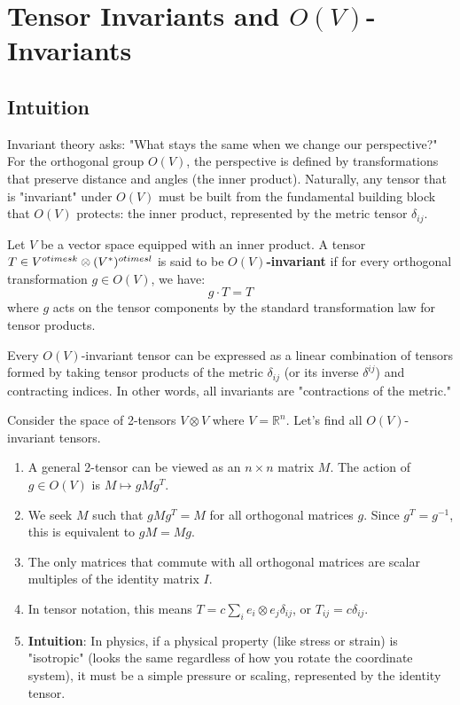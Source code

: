 \section{Tensor Invariants and $O(V)$-Invariants}

\subsection{Intuition}
Invariant theory asks: "What stays the same when we change our perspective?" For the orthogonal group $O(V)$, the perspective is defined by transformations that preserve distance and angles (the inner product). Naturally, any tensor that is "invariant" under $O(V)$ must be built from the fundamental building block that $O(V)$ protects: the inner product, represented by the metric tensor $\delta_{ij}$.

\begin{definition}
Let $V$ be a vector space equipped with an inner product. A tensor $T \in V^{\\otimes k} \otimes (V^*)^{\\otimes l}$ is said to be \textbf{$O(V)$-invariant} if for every orthogonal transformation $g \in O(V)$, we have:
\[ g \cdot T = T \]
where $g$ acts on the tensor components by the standard transformation law for tensor products.
\end{definition}

\begin{theorem}
Every $O(V)$-invariant tensor can be expressed as a linear combination of tensors formed by taking tensor products of the metric $\delta_{ij}$ (or its inverse $\delta^{ij}$) and contracting indices. In other words, all invariants are "contractions of the metric."
\end{theorem}

\begin{example}
Consider the space of 2-tensors $V \otimes V$ where $V = \mathbb{R}^n$. Let's find all $O(V)$-invariant tensors.
\begin{enumerate}
    \item A general 2-tensor can be viewed as an $n \times n$ matrix $M$. The action of $g \in O(V)$ is $M \mapsto g M g^T$.
    \item We seek $M$ such that $g M g^T = M$ for all orthogonal matrices $g$. Since $g^T = g^{-1}$, this is equivalent to $g M = M g$.
    \item The only matrices that commute with all orthogonal matrices are scalar multiples of the identity matrix $I$.
    \item In tensor notation, this means $T = c \sum_i e_i \otimes e_j \delta_{ij}$, or $T_{ij} = c \delta_{ij}$.
    \item \textbf{Intuition}: In physics, if a physical property (like stress or strain) is "isotropic" (looks the same regardless of how you rotate the coordinate system), it must be a simple pressure or scaling, represented by the identity tensor.
\end{enumerate}
\end{example}

